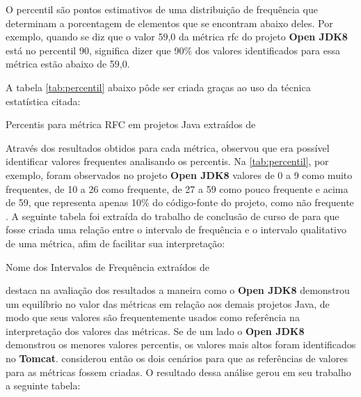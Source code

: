 O percentil são pontos estimativos de uma distribuição de frequência que determinam a porcentagem de elementos que se encontram abaixo deles. Por exemplo, quando se diz que o valor 59,0 da métrica rfc do projeto \textbf{Open JDK8} está no percentil 90, significa dizer que 90\% dos valores identificados para essa métrica estão abaixo de 59,0. 

A tabela \ref{tab:percentil} abaixo pôde ser criada graças ao uso da técnica estatística citada:
	
	\begin{table}[!ht]
	\begin{center}
	
	 
	\caption{Percentis para métrica RFC em projetos Java extraídos de  
	}
	\label{tab:percentil}
	\end{center}
	\end{table}	
	\FloatBarrier	

Através dos resultados obtidos para cada métrica,  observou que era possível identificar valores frequentes analisando os percentis. Na \ref{tab:percentil}, por exemplo, foram observados no projeto \textbf{Open JDK8} valores de 0 a 9 como muito frequentes, de 10 a 26 como frequente, de 27 a 59 como pouco frequente e acima de 59, que representa apenas 10\% do código-fonte do projeto, como não frequente \cite{Meirelles2013}. A seguinte tabela foi extraída do trabalho de conclusão de curso de  para que fosse criada uma relação entre o intervalo de frequência e o intervalo qualitativo de uma métrica, afim de facilitar sua interpretação:

\begin{table}[!ht]
	\begin{center}
	
	\caption{Nome dos Intervalos de Frequência extraídos de }
	\label{tab:nomes}
	\end{center}
	\end{table}
	\FloatBarrier
	
	 
 destaca na avaliação dos resultados a maneira como o \textbf{Open JDK8} demonstrou um equilíbrio no valor das métricas em relação aos demais projetos Java, de modo que seus valores são frequentemente usados como referência na interpretação dos valores das métricas. Se de um lado o  \textbf{Open JDK8} demonstrou os menores valores percentis, os valores mais altos foram identificados no \textbf{Tomcat}.  considerou então os dois cenários para que as referências de valores para as métricas fossem criadas. O resultado dessa análise gerou em seu trabalho a seguinte tabela:

